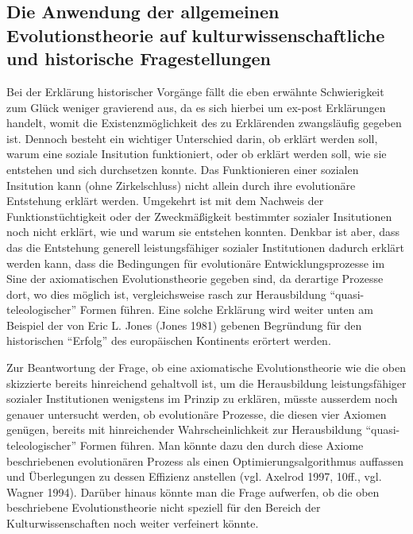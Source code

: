 \documentclass[12pt,a4paper,ngerman]{article}
\begin{document}
\subsection{Die Anwendung der allgemeinen Evolutionstheorie auf kulturwissenschaftliche und historische Fragestellungen}

Bei der Erklärung historischer Vorgänge fällt die eben erwähnte Schwierigkeit zum
Glück weniger gravierend aus, da es sich hierbei um ex-post
Erklärungen handelt, womit die Existenzmöglichkeit des zu Erklärenden
zwangsläufig gegeben ist. Dennoch besteht ein wichtiger Unterschied
darin, ob erklärt werden soll, warum eine soziale Insitution
funktioniert, oder ob erklärt werden soll, wie sie entstehen und sich
durchsetzen konnte. Das Funktionieren einer sozialen Insitution kann
(ohne Zirkelschluss) nicht allein durch ihre evolutionäre Entstehung
erklärt werden. Umgekehrt ist mit dem Nachweis der
Funktionstüchtigkeit oder der Zweckmäßigkeit bestimmter sozialer
Insitutionen noch nicht erklärt, wie und warum sie entstehen
konnten. Denkbar ist aber, dass das die Entstehung generell
leistungsfähiger sozialer Institutionen dadurch erklärt werden kann,
dass die Bedingungen für evolutionäre Entwicklungsprozesse im Sine der
axiomatischen Evolutionstheorie gegeben sind, da derartige Prozesse
dort, wo dies möglich ist, vergleichsweise rasch zur Herausbildung
"`quasi-teleologischer"' Formen führen. Eine solche Erklärung wird
weiter unten am Beispiel der von Eric L. Jones (Jones 1981) gebenen
Begründung für den historischen "`Erfolg"' des europäischen Kontinents
erörtert werden.

Zur Beantwortung der Frage, ob eine axiomatische Evolutionstheorie wie
die oben skizzierte bereits hinreichend gehaltvoll ist, um die
Herausbildung leistungsfähiger sozialer Institutionen wenigstens im
Prinzip zu erklären, müsste ausserdem noch genauer untersucht werden,
ob evolutionäre Prozesse, die diesen vier Axiomen genügen, bereits mit
hinreichender Wahrscheinlichkeit zur Herausbildung
"`quasi-teleologischer"' Formen führen. Man könnte dazu den durch
diese Axiome beschriebenen evolutionären Prozess als einen
Optimierungsalgorithmus auffassen und Überlegungen
zu dessen Effizienz anstellen (vgl. Axelrod 1997, 10ff., vgl. Wagner 1994). 
Darüber hinaus könnte man die Frage aufwerfen, ob
die oben beschriebene Evolutionstheorie nicht speziell für den Bereich
der Kulturwissenschaften noch weiter verfeinert könnte.
\end{document}

